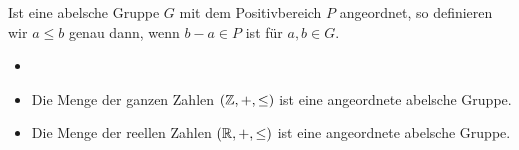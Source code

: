 \begin{bem}\label{angeordnetAbelsch} %
Ist eine abelsche Gruppe $G$ mit dem Positivbereich $P$ angeordnet, so definieren wir $a \leq b$ genau dann, wenn $b - a \in P$ ist für $a, b \in G$.
\end{bem}
%
%
%
%
%
\begin{bsp}
\begin{itemize}
\item[]
\item Die Menge der ganzen Zahlen $\left(\mathbb{Z}, +, \leq\right)$ ist eine angeordnete abelsche Gruppe.
\item Die Menge der reellen Zahlen $\left(\mathbb{R}, +, \leq\right)$ ist eine angeordnete abelsche Gruppe.
\end{itemize} 
\end{bsp}
                                                                                                                     
%

